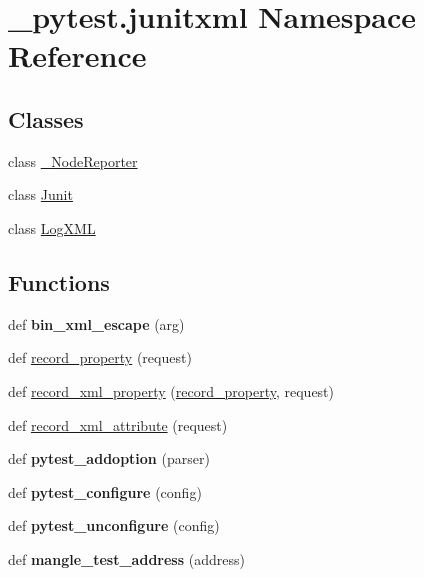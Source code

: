 \hypertarget{namespace__pytest_1_1junitxml}{}\section{\+\_\+pytest.\+junitxml Namespace Reference}
\label{namespace__pytest_1_1junitxml}
\subsection*{Classes}
\begin{DoxyCompactItemize}
\item 
class \hyperlink{class__pytest_1_1junitxml_1_1___node_reporter}{\+\_\+\+Node\+Reporter}
\item 
class \hyperlink{class__pytest_1_1junitxml_1_1_junit}{Junit}
\item 
class \hyperlink{class__pytest_1_1junitxml_1_1_log_x_m_l}{Log\+X\+ML}
\end{DoxyCompactItemize}
\subsection*{Functions}
\begin{DoxyCompactItemize}
\item 
\mbox{\label{namespace__pytest_1_1junitxml_a9b28eb9d59688192401be9656b8a602e}} 
def {\bfseries bin\+\_\+xml\+\_\+escape} (arg)
\item 
def \hyperlink{namespace__pytest_1_1junitxml_ad331b67a9b40cbd4121576852a296315}{record\+\_\+property} (request)
\item 
def \hyperlink{namespace__pytest_1_1junitxml_ac77a0ad7f33416d08a6654bbdb865c11}{record\+\_\+xml\+\_\+property} (\hyperlink{namespace__pytest_1_1junitxml_ad331b67a9b40cbd4121576852a296315}{record\+\_\+property}, request)
\item 
def \hyperlink{namespace__pytest_1_1junitxml_a4cff71db329d352c81f33eba5cdff813}{record\+\_\+xml\+\_\+attribute} (request)
\item 
\mbox{\label{namespace__pytest_1_1junitxml_a1372505e9b14fb5da350ae4f1cb3a90d}} 
def {\bfseries pytest\+\_\+addoption} (parser)
\item 
\mbox{\label{namespace__pytest_1_1junitxml_a269ff98cb82d06fcf931fd5765245ec2}} 
def {\bfseries pytest\+\_\+configure} (config)
\item 
\mbox{\label{namespace__pytest_1_1junitxml_ab59dbbc8ffd1bd2c0bc43033f037131e}} 
def {\bfseries pytest\+\_\+unconfigure} (config)
\item 
\mbox{\label{namespace__pytest_1_1junitxml_a631c21582da0508cb52f6bf437006df2}} 
def {\bfseries mangle\+\_\+test\+\_\+address} (address)
\end{DoxyCompactItemize}
